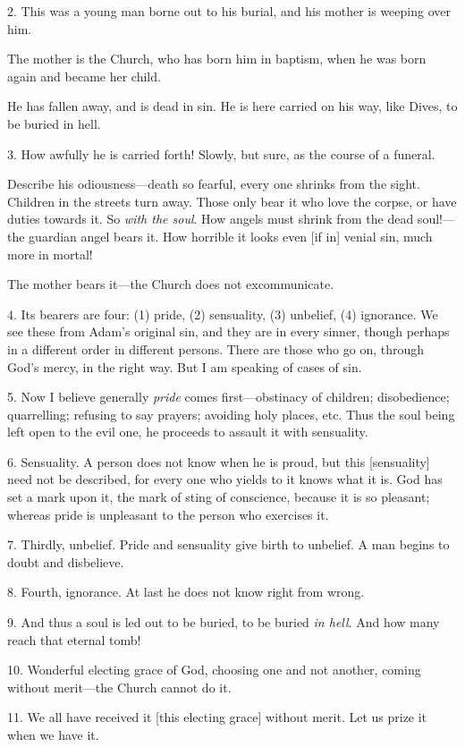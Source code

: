 2. This was a young man borne out to his burial,
and his mother is weeping over him.

The mother is the Church, who has born him in
baptism, when he was born again and became her child.

He has fallen away, and is dead in sin. He is
here carried on his way, like Dives, to be buried in hell.

3. How awfully he is carried forth! Slowly, but
sure, as the course of a funeral.

Describe his odiousness—death so fearful, every
one shrinks from the sight. Children in the streets turn away. Those
only bear it who love the corpse, or have duties towards it. So \emph{with
the soul}. How angels must shrink from the dead soul!—the
guardian angel bears it. How horrible it looks even [if in] venial
sin, much more in mortal!

The mother bears it—the Church does not
excommunicate.

4. Its bearers are four: (1) pride, (2)
sensuality, (3) unbelief, (4) ignorance. We see these from Adam's
original sin, and they are in every sinner, though perhaps in a
different order in different persons. There are those who go on,
through God's mercy, in the right way. But I am speaking of cases of
sin.

5. Now I believe generally \emph{pride} comes
first—obstinacy of children; disobedience; quarrelling; refusing to
say prayers; avoiding holy places, etc. Thus the soul being left open
to the evil one, he proceeds to assault it with sensuality.

6. Sensuality. A person does not know when he is
proud, but this [sensuality] need not be described, for every one who
yields to it knows what it is. God has set a mark upon it, the mark of
sting of conscience, because it is so pleasant; whereas pride is
unpleasant to the person who exercises it.

7. Thirdly, unbelief. Pride and sensuality give
birth to unbelief. A man begins to doubt and disbelieve.

8. Fourth, ignorance. At last he does not know
right from wrong.

9. And thus a soul is led out to be buried, to be
buried \emph{in hell}. And how many reach that eternal tomb!

10. Wonderful electing grace of God, choosing
one and not another, coming without merit—the Church cannot do
it.

11. We all have received it [this electing grace]
without merit. Let us prize it when we have it.

